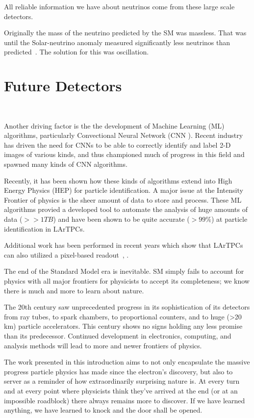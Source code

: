 All reliable information we have about neutrinos come from these large scale detectors.

Originally the mass of the neutrino predicted by the SM was massless.
That was until the Solar-neutrino anomaly measured significantly less neutrinos than predicted~\citep{solar_neutrino_problem_PhysRevLett.20.1205}.
The solution for this was oscillation.

\section{Future Detectors}~\label{sec:future_detectors}

\citep{Sadowski_2017}
Another driving factor is the the development of Machine Learning (ML) algorithms, particularly Convectional Neural Network (CNN \citep{Sadowski2017DeepLI}).
Recent industry has driven the need for CNNs to be able to correctly identify and label 2-D images of various kinds, and thus championed much of progress in this field and spawned many kinds of CNN algorithms.

Recently, it has been shown how these kinds of algorithms extend into High Energy Physics (HEP) for particle identification.
A major issue at the Intensity Frontier of physics is the sheer amount of data to store and process.
These ML algorithms provied a developed tool to automate the analysis of huge amounts of data ($>> 1 TB$) and have been shown to be quite accurate ($>99\%$) at particle identification in LArTPCs.


Additional work has been performed in recent years which show that LArTPCs can also utilized a pixel-based readout~\citep{larpix:Dwyer_2018}, \citep{Asaadi_2018}.

The end of the Standard Model era is inevitable.
SM simply fails to account for physics with all major frontiers for physicists to accept its completeness; we know there is much and more to learn about nature.

The 20th century saw unprecedented progress in its sophistication of its detectors from ray tubes, to spark chambers, to proportional counters, and to huge (>20 km) particle accelerators.
This century shows no signs holding any less promise than its predecessor.
Continued development in electronics, computing, and analysis methods will lead to more and newer frontiers of physics.

The work presented in this introduction aims to not only encapsulate the massive progress particle physics has made since the electron's discovery, but also to server as a reminder of how extraordinarily surprising nature is.
At every turn and at every point where physicists think they've arrived at the end (or at an impossible roadblock) there always remains more to discover.
If we have learned anything, we have learned to knock and the door shall be opened.

